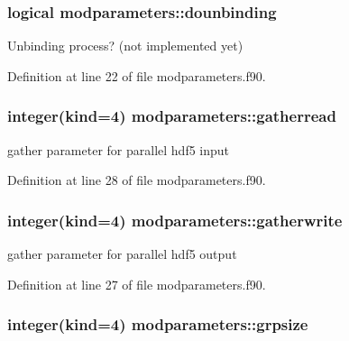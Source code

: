 \hypertarget{classmodparameters_a80bb718489050f3b3c056aae1774984d}{
\subsubsection[{dounbinding}]{\setlength{\rightskip}{0pt plus 5cm}logical modparameters\-::dounbinding}}\label{classmodparameters_a80bb718489050f3b3c056aae1774984d}


Unbinding process? (not implemented yet) 



Definition at line 22 of file modparameters.\-f90.

\hypertarget{classmodparameters_a84036969384f84bc7f548da8e1a4fe56}{
\subsubsection[{gatherread}]{\setlength{\rightskip}{0pt plus 5cm}integer(kind=4) modparameters\-::gatherread}}\label{classmodparameters_a84036969384f84bc7f548da8e1a4fe56}


gather parameter for parallel hdf5 input 



Definition at line 28 of file modparameters.\-f90.

\hypertarget{classmodparameters_af4816764e904006783425cbe7a1d2498}{
\subsubsection[{gatherwrite}]{\setlength{\rightskip}{0pt plus 5cm}integer(kind=4) modparameters\-::gatherwrite}}\label{classmodparameters_af4816764e904006783425cbe7a1d2498}


gather parameter for parallel hdf5 output 



Definition at line 27 of file modparameters.\-f90.

\hypertarget{classmodparameters_a6a42cee2694995ca6ca39decb47a6303}{
\subsubsection[{grpsize}]{\setlength{\rightskip}{0pt plus 5cm}integer(kind=4) modparameters\-::grpsize}}\label{classmodparameters_a6a42cee2694995ca6ca39decb47a6303}


